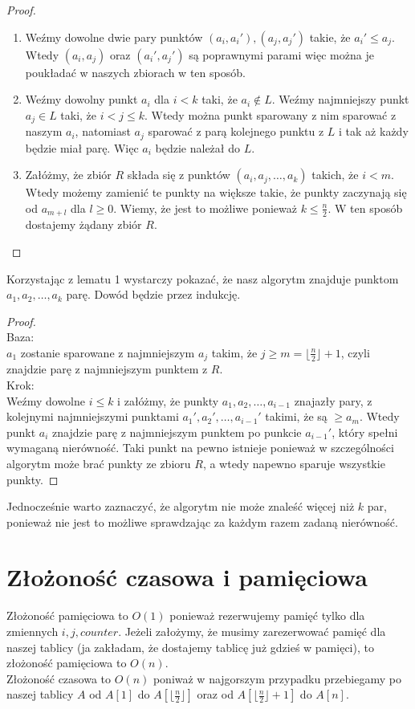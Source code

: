 \documentclass[11pt,wide]{mwart}
\begin{document}
\begin{proof} $ $\\
\begin{enumerate}
\item Weźmy dowolne dwie pary punktów $(a_i, a_i'), (a_j, a_j')$ takie, że $a_i' \leq a_j$. Wtedy $(a_i, a_j)$ oraz $(a_i', a_j')$ są poprawnymi parami więc można je poukładać w naszych zbiorach w ten sposób.
\item Weźmy dowolny punkt $a_i$ dla $i < k$ taki, że $a_i \notin L$. Weźmy najmniejszy punkt $a_j \in L$ taki, że $i < j \leq k$. Wtedy można punkt sparowany z nim sparować z naszym $a_i$, natomiast $a_j$ sparować z parą kolejnego punktu z $L$ i tak aż każdy będzie miał parę. Więc $a_i$ będzie należał do $L$.
\item Załóżmy, że zbiór $R$ składa się z punktów $(a_{i}, a_{j}, \dots, a_{k})$ takich, że $i < m$. Wtedy możemy zamienić te punkty na większe takie, że punkty zaczynają się od $a_{m+l}$ dla $l \geq 0$. Wiemy, że jest to możliwe ponieważ $k \leq \frac{n}{2}$. W ten sposób dostajemy żądany zbiór $R$. 
\end{enumerate}

\end{proof}

Korzystając z lematu 1 wystarczy pokazać, że nasz algorytm znajduje punktom $a_1, a_2, \dots, a_k$ parę.
Dowód będzie przez indukcję.
\begin{proof} $ $\\
Baza:\\
$a_1$ zostanie sparowane z najmniejszym $a_j$ takim, że $j \geq m = \lfloor \frac{n}{2} \rfloor + 1$, czyli znajdzie parę z najmniejszym punktem z $R$.\\
Krok:\\
Weźmy dowolne $i \leq k$ i załóżmy, że punkty $a_1, a_2, \dots, a_{i-1}$ znajazły pary, z kolejnymi najmniejszymi punktami $a_1', a_2', \dots, a_{i-1}'$ takimi, że są $\geq a_m$. Wtedy punkt $a_i$ znajdzie parę z najmniejszym punktem po punkcie $a_{i-1}'$, który spełni wymaganą nierówność. Taki punkt na pewno istnieje ponieważ w szczególności algorytm może brać punkty ze zbioru $R$, a wtedy napewno sparuje wszystkie punkty.
\end{proof}
Jednocześnie warto zaznaczyć, że algorytm nie może znaleść więcej niż $k$ par, ponieważ nie jest to możliwe sprawdzając za każdym razem zadaną nierówność.


\section{Złożoność czasowa i pamięciowa}
Złożoność pamięciowa to $O(1)$ ponieważ rezerwujemy pamięć tylko dla zmiennych $i, j, counter$. Jeżeli założymy, że musimy zarezerwować pamięć dla naszej tablicy (ja zakładam, że dostajemy tablicę już gdzieś w pamięci), to złożoność pamięciowa to $O(n)$.\\
Złożoność czasowa to $O(n)$ poniważ w najgorszym przypadku przebiegamy po naszej tablicy $A$ od $A[1]$ do $A[\lfloor \frac{n}{2} \rfloor ]$ oraz od $A[\lfloor \frac{n}{2} \rfloor + 1]$ do $A[n]$.
\end{document}
